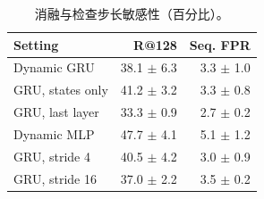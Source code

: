 \begin{table}[t]
\centering\footnotesize
\caption{消融与检查步长敏感性（百分比）。}\label{tab:ablation}
\begin{tabular}{lrr}\toprule
Setting & R@128 & Seq. FPR \\
\midrule
Dynamic GRU & 38.1 $\pm$ 6.3 & 3.3 $\pm$ 1.0 \\
GRU, states only & 41.2 $\pm$ 3.2 & 3.3 $\pm$ 0.8 \\
GRU, last layer & 33.3 $\pm$ 0.9 & 2.7 $\pm$ 0.2 \\
Dynamic MLP & 47.7 $\pm$ 4.1 & 5.1 $\pm$ 1.2 \\
GRU, stride 4 & 40.5 $\pm$ 4.2 & 3.0 $\pm$ 0.9 \\
GRU, stride 16 & 37.0 $\pm$ 2.2 & 3.5 $\pm$ 0.2 \\
\bottomrule\end{tabular}
\end{table}
